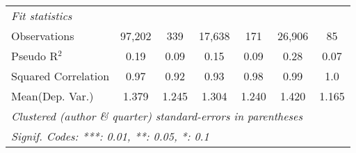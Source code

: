 \begin{tabular}{lcccccc}
   \midrule
   \emph{Fit statistics}\\
   Observations                                               & 97,202  & 339         & 17,638       & 171            & 26,906       & 85\\  
   Pseudo R$^2$                                               & 0.19    & 0.09        & 0.15         & 0.09           & 0.28         & 0.07\\  
   Squared Correlation                                        & 0.97    & 0.92        & 0.93         & 0.98           & 0.99         & 1.0\\  
Mean(Dep. Var.) & 1.379 & 1.245 & 1.304 & 1.240 & 1.420 & 1.165 \\
   \midrule \midrule
   \multicolumn{7}{l}{\emph{Clustered (author \& quarter) standard-errors in parentheses}}\\
   \multicolumn{7}{l}{\emph{Signif. Codes: ***: 0.01, **: 0.05, *: 0.1}}\\
\end{tabular}
\par\endgroup
